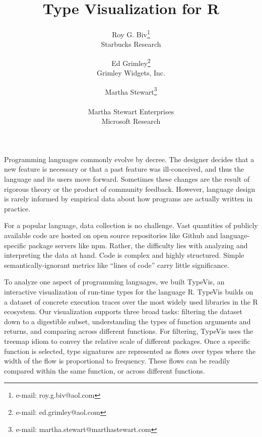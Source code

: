\documentclass{vgtc}                          %
\title{Type Visualization for R}
\author{Roy G. Biv\thanks{e-mail: roy.g.biv@aol.com}\\ %
        \scriptsize Starbucks Research %
\and Ed Grimley\thanks{e-mail: ed.grimley@aol.com}\\ %
     \scriptsize Grimley Widgets, Inc. %
\and Martha Stewart\thanks{e-mail: martha.stewart@marthastewart.com}\\ %
     \parbox{1.4in}{\scriptsize \centering Martha Stewart Enterprises \\ Microsoft Research}}
\begin{document}


\maketitle


Programming languages commonly evolve by decree. The designer
decides that a new feature is necessary or that a past feature was
ill-conceived, and thus the language and its users move forward.
Sometimes these changes are the result of rigorous theory
or the product of community feedback. However, language design is
rarely informed by empirical data about how programs are actually
written in practice.

For a popular language, data collection is no challenge. Vast
quantities of publicly available code are hosted on open source
repositories like Github and language-specific package servers like npm.
Rather, the difficulty lies with analyzing and interpreting the data
at hand. Code is complex and highly structured. Simple
semantically-ignorant metrics like ``lines of code''
carry little significance.

To analyze one aspect of programming languages, we built {\sc TypeVis},
an interactive visualization of run-time types for the language R.
{\sc TypeVis} builds on a dataset of concrete execution traces
over the most widely used libraries in the R ecosystem.
Our visualization supports three broad tasks:
filtering the dataset down to a digestible subset,
understanding the types of function arguments and returns,
and comparing across different functions.
For filtering, {\sc TypeVis} uses the treemap idiom
to convey the relative scale of different packages.
Once a specific function is selected,
type signatures are represented as flows over types
where the width of the flow is proportional to frequency.
These flows can be readily compared within the same function,
or across different functions.
\end{document}
